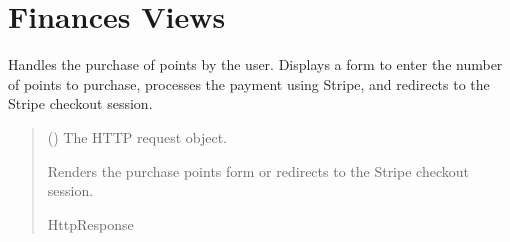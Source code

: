 \documentclass[letterpaper,10pt,english]{sphinxmanual}
\begin{document}
\section{Finances Views}
\label{\detokenize{modules/views:module-finances.views}}\label{\detokenize{modules/views:finances-views}}

\begin{fulllineitems}
\label{\detokenize{modules/views:finances.views.purchase_points}}
\pysigstartsignatures
{}
\pysigstopsignatures
\sphinxAtStartPar
Handles the purchase of points by the user. Displays a form to enter the number of points to purchase,
processes the payment using Stripe, and redirects to the Stripe checkout session.
\begin{quote}\begin{description}
\sphinxAtStartPar
{} () \textendash{} The HTTP request object.

\sphinxAtStartPar
Renders the purchase points form or redirects to the Stripe checkout session.

\sphinxAtStartPar
HttpResponse

\end{description}\end{quote}

\end{fulllineitems}

\end{document}
